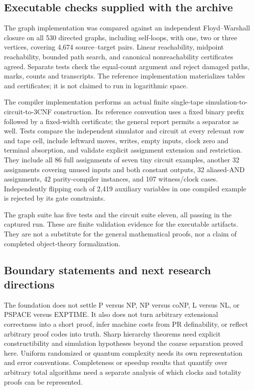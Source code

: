 \subsection{Executable checks supplied with the archive}

The graph implementation was compared against an independent
Floyd--Warshall closure on all 530 directed graphs, including self-loops,
with one, two or three vertices, covering 4,674 source--target pairs.
Linear reachability, midpoint reachability, bounded path search, and
canonical nonreachability certificates agreed. Separate tests check the
equal-count argument and reject damaged paths, marks, counts and transcripts.
The reference implementation materializes tables and certificates; it is
not claimed to run in logarithmic space.

The compiler implementation performs an actual finite single-tape
simulation-to-circuit-to-3CNF construction. Its reference convention uses
a fixed binary prefix followed by a fixed-width certificate; the general
report permits a separator as well. Tests compare the independent simulator
and circuit at every relevant row and tape cell, include leftward moves,
writes, empty inputs, clock zero and terminal absorption, and validate
explicit assignment extension and restriction. They include all 86 full
assignments of seven tiny circuit examples, another 32 assignments covering
unused inputs and both constant outputs, 32 aliased-AND assignments,
42 parity-compiler instances, and 107 witness/clock cases. Independently
flipping each of 2,419 auxiliary variables in one compiled example is
rejected by its gate constraints.

The graph suite has five tests and the circuit suite eleven, all passing in
the captured run. These are finite validation evidence for the executable
artifacts. They are not a substitute for the general mathematical proofs,
nor a claim of completed object-theory formalization.

\subsection{Boundary statements and next research directions}

The foundation does not settle P versus NP, NP versus coNP, L versus NL,
or PSPACE versus EXPTIME. It also does not turn arbitrary extensional
correctness into a short proof, infer machine costs from PR definability,
or reflect arbitrary \ipra{} proof codes into truth. Sharp hierarchy
theorems need explicit constructibility and simulation hypotheses beyond
the coarse separation proved here. Uniform randomized or quantum
complexity needs its own representation and error conventions. Completeness
or speedup results that quantify over arbitrary total algorithms need a
separate analysis of which clocks and totality proofs can be represented.

